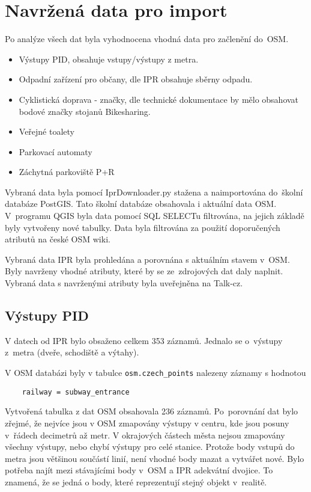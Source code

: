 \section{Navržená data pro import}
\label{Navržená data pro import}

Po analýze všech dat byla vyhodnocena vhodná data pro začlenění
do~OSM.

\begin{itemize}
    \item   Výstupy PID, obsahuje vstupy/výstupy z metra.
    \item   Odpadní zařízení pro občany, dle IPR obsahuje sběrny
                odpadu. 
    \item   Cyklistická doprava - značky, dle technické dokumentace by
                mělo 
            obsahovat bodové značky stojanů Bikesharing.
    \item   Veřejné toalety
    \item   Parkovací automaty
    \item   Záchytná parkoviště P+R
\end{itemize}

Vybraná data byla pomocí IprDownloader.py stažena a naimportována
do~škol\-ní databáze PostGIS. Tato školní databáze obsahovala i aktuální data OSM. V~programu QGIS byla data pomocí SQL SELECTu
filtrována, na jejich základě byly vytvořeny nové tabulky. Data byla filtrována za použití doporučených atributů na české
OSM wiki. \cite{OSMfeatures}

Vybraná data IPR byla prohledána a porovnána s aktuálním stavem v~OSM.
Byly navrženy vhodné atributy, které by se ze~zdrojových dat daly
naplnit. Vybraná data s navrženými atributy byla uveřejněna na Talk-cz.


\subsection{Výstupy PID}
\label{Výstupy PID}
V datech od IPR bylo obsaženo celkem 353 záznamů. Jednalo se
o~výstupy z~metra (dveře, schodiště a výtahy).

V OSM databázi byly v tabulce {\tt osm.czech\_points}
nalezeny záznamy s hodnotou
\begin{verbatim}
    railway = subway_entrance
\end{verbatim}
Vytvořená tabulka z dat OSM obsahovala 236 záznamů. Po~porovnání dat
bylo zřejmé, že nejvíce jsou v OSM zmapovány výstupy v centru, kde
jsou posuny v~řádech decimetrů až metr. V okrajových částech města
nejsou zmapovány všechny výstupy, nebo chybí výstupy pro celé stanice.
Protože body vstupů do metra jsou většinou součástí linií, není vhodné
body mazat a vytvářet nové. Bylo potřeba najít mezi stávajícími body
v~OSM a IPR adekvátní dvojice. To znamená, že se jedná o body, které
reprezentují stejný objekt v~realitě.

